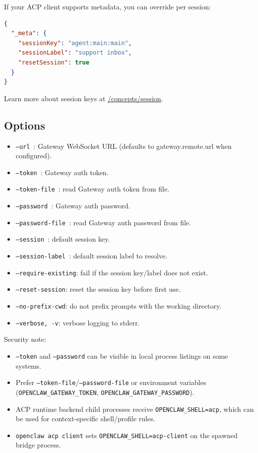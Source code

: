 If your ACP client supports metadata, you can override per session:

\begin{lstlisting}[language=json]
{
  "_meta": {
    "sessionKey": "agent:main:main",
    "sessionLabel": "support inbox",
    "resetSession": true
  }
}
\end{lstlisting}


Learn more about session keys at \href{/concepts/session}{/concepts/session}.

\subsection{Options}


\begin{itemize}
  \item \texttt{--url }: Gateway WebSocket URL (defaults to gateway.remote.url when configured).
  \item \texttt{--token }: Gateway auth token.
  \item \texttt{--token-file }: read Gateway auth token from file.
  \item \texttt{--password }: Gateway auth password.
  \item \texttt{--password-file }: read Gateway auth password from file.
  \item \texttt{--session }: default session key.
  \item \texttt{--session-label }: default session label to resolve.
  \item \texttt{--require-existing}: fail if the session key/label does not exist.
  \item \texttt{--reset-session}: reset the session key before first use.
  \item \texttt{--no-prefix-cwd}: do not prefix prompts with the working directory.
  \item \texttt{--verbose, -v}: verbose logging to stderr.
\end{itemize}


Security note:

\begin{itemize}
  \item \texttt{--token} and \texttt{--password} can be visible in local process listings on some systems.
  \item Prefer \texttt{--token-file}/\texttt{--password-file} or environment variables (\texttt{OPENCLAW\_GATEWAY\_TOKEN}, \texttt{OPENCLAW\_GATEWAY\_PASSWORD}).
  \item ACP runtime backend child processes receive \texttt{OPENCLAW\_SHELL=acp}, which can be used for context-specific shell/profile rules.
  \item \texttt{openclaw acp client} sets \texttt{OPENCLAW\_SHELL=acp-client} on the spawned bridge process.
\end{itemize}



